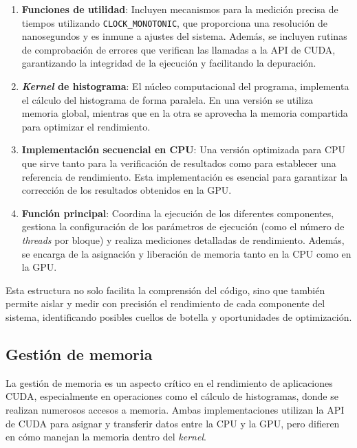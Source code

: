         \begin{enumerate}
        
            \item \textbf{Funciones de utilidad}: Incluyen mecanismos para la medición precisa de tiempos utilizando \texttt{CLOCK\_MONOTONIC}, que proporciona una resolución de nanosegundos y es inmune a ajustes del sistema. Además, se incluyen rutinas de comprobación de errores que verifican las llamadas a la API de CUDA, garantizando la integridad de la ejecución y facilitando la depuración.
            
            \item \textbf{\textit{Kernel} de histograma}: El núcleo computacional del programa, implementa el cálculo del histograma de forma paralela. En una versión se utiliza memoria global, mientras que en la otra se aprovecha la memoria compartida para optimizar el rendimiento.
            
            \item \textbf{Implementación secuencial en CPU}: Una versión optimizada para CPU que sirve tanto para la verificación de resultados como para establecer una referencia de rendimiento. Esta implementación es esencial para garantizar la corrección de los resultados obtenidos en la GPU.
            
            \item \textbf{Función principal}: Coordina la ejecución de los diferentes componentes, gestiona la configuración de los parámetros de ejecución (como el número de \textit{threads} por bloque) y realiza mediciones detalladas de rendimiento. Además, se encarga de la asignación y liberación de memoria tanto en la CPU como en la GPU.
            
        \end{enumerate}

        Esta estructura no solo facilita la comprensión del código, sino que también permite aislar y medir con precisión el rendimiento de cada componente del sistema, identificando posibles cuellos de botella y oportunidades de optimización.

    \subsection{Gestión de memoria}

        La gestión de memoria es un aspecto crítico en el rendimiento de aplicaciones CUDA, especialmente en operaciones como el cálculo de histogramas, donde se realizan numerosos accesos a memoria. Ambas implementaciones utilizan la API de CUDA para asignar y transferir datos entre la CPU y la GPU, pero difieren en cómo manejan la memoria dentro del \textit{kernel}.
        
